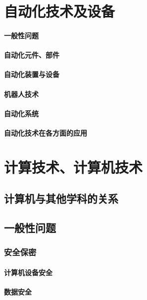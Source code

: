 \documentclass[UTF8]{../../ApplicationUniverse}
\begin{document}
\chapter{自动化技术及设备}
\subsubsection{一般性问题}
\subsubsection{自动化元件、部件}
\subsubsection{自动化装置与设备}
\subsubsection{机器人技术}
\subsubsection{自动化系统}
\subsubsection{自动化技术在各方面的应用}












\chapter{计算技术、计算机技术}
\section{计算机与其他学科的关系}
\section{一般性问题}
    \subsection{安全保密}
        \subsubsection{计算机设备安全}
        \subsubsection{数据安全}
\end{document}
